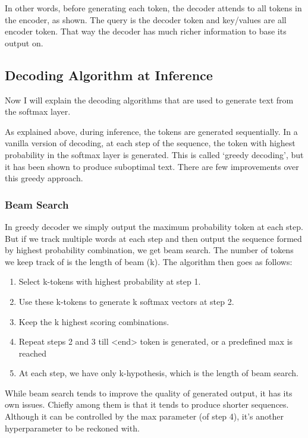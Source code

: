 \documentclass[]{krantz}
\providecommand{\tightlist}{%
  \setlength{\itemsep}{0pt}\setlength{\parskip}{0pt}}
\begin{document}
In other words, before generating each token, the decoder attends to all tokens in the encoder, as shown. The query is the decoder token and key/values are all encoder token. That way the decoder has much richer information to base its output on.

\hypertarget{decoding-algorithm-at-inference}{%
\subsection{Decoding Algorithm at Inference}\label{decoding-algorithm-at-inference}}

Now I will explain the decoding algorithms that are used to generate text from the softmax layer.

As explained above, during inference, the tokens are generated sequentially. In a vanilla version of decoding, at each step of the sequence, the token with highest probability in the softmax layer is generated. This is called `greedy decoding', but it has been shown to produce suboptimal text. There are few improvements over this greedy approach.

\hypertarget{beam-search}{%
\subsubsection{Beam Search}\label{beam-search}}

In greedy decoder we simply output the maximum probability token at each step. But if we track multiple words at each step and then output the sequence formed by highest probability combination, we get beam search. The number of tokens we keep track of is the length of beam (k). The algorithm then goes as follows:

\begin{enumerate}
\def\labelenumi{\arabic{enumi}.}
\tightlist
\item
  Select k-tokens with highest probability at step 1.
\item
  Use these k-tokens to generate k softmax vectors at step 2.
\item
  Keep the k highest scoring combinations.
\item
  Repeat steps 2 and 3 till \textless{}end\textgreater{} token is generated, or a predefined max is reached
\item
  At each step, we have only k-hypothesis, which is the length of beam search.
\end{enumerate}

While beam search tends to improve the quality of generated output, it has its own issues. Chiefly among them is that it tends to produce shorter sequences. Although it can be controlled by the max parameter (of step 4), it's another hyperparameter to be reckoned with.
\end{document}
